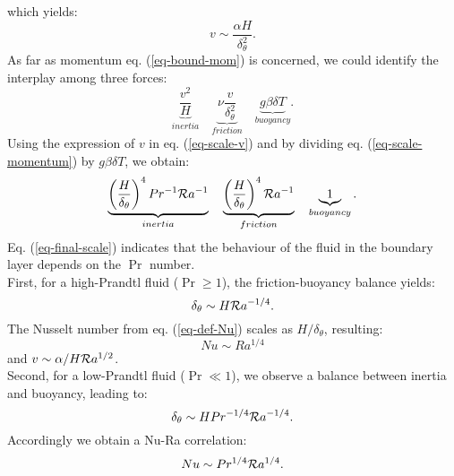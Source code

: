 which yields:
\begin{equation} \label{eq-scale-v}
	v \sim \frac{\alpha H}{\delta_\theta^2}.
\end{equation}
As far as momentum eq. (\ref{eq-bound-mom}) is concerned, we could identify the interplay among three forces:
\begin{equation} \label{eq-scale-momentum}
	\underbrace{\frac{v^2}{H}}_{inertia} \quad \underbrace{\nu \frac{v}{\delta_\theta^2}}_{friction} \quad \underbrace{g \beta \delta T}_{buoyancy}.
\end{equation}
Using the expression of $v$ in eq. (\ref{eq-scale-v}) and by dividing eq. (\ref{eq-scale-momentum}) by $g \beta \delta T$, we obtain:
\begin{equation} \label{eq-final-scale}
	\underbrace{\left( \frac{H}{\delta_\theta} \right)^4 Pr ^{-1} {\cal R}a^{-1}}_{inertia} \quad  \underbrace{\left( \frac{H}{\delta_\theta} \right)^4 {\cal R}a^{-1}}_{friction} \quad \underbrace{1}_{buoyancy}.
\end{equation}
Eq. (\ref{eq-final-scale}) indicates that the behaviour of the fluid in the boundary layer depends on the $\Pr$ number. \\
First, for a high-Prandtl fluid ($\Pr \geq 1$), the friction-buoyancy balance yields: 
\begin{equation} \label{eq-scale-nbd-high-Pr}
	\delta_\theta \sim H {\cal R}a^{-1/4}.
\end{equation}
The Nusselt number from eq. (\ref{eq-def-Nu}) scales as $H/\delta_\theta$, resulting: 
\begin{equation}
	N\!u \sim Ra^{1/4}
\end{equation}
and $v \sim \alpha/H {\cal R}a^{1/2}$. \\
Second, for a low-Prandtl fluid ($\Pr \ll 1$), we observe a balance between inertia and buoyancy, leading to:
\begin{equation} \label{eq-corr-Low-Pr}
	\delta_\theta \sim H Pr^{-1/4} {\cal R}a^{-1/4}.
\end{equation}
Accordingly we obtain a Nu-Ra correlation:
\begin{equation}
	Nu \sim Pr^{1/4} {\cal R}a^{1/4}.
\end{equation}

